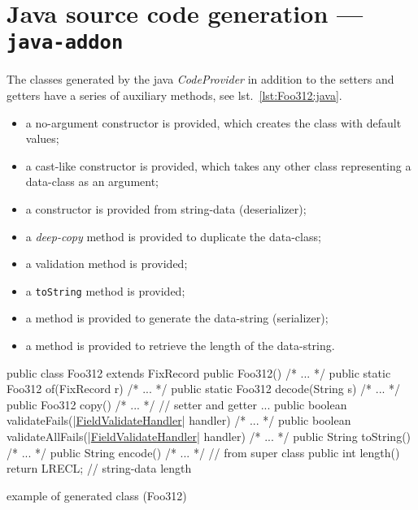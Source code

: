 \section{Java source code generation --- \texttt{java-addon}} 
\label{sec:java.addon}
The classes generated by the java \textsl{CodeProvider} in addition to the 
setters and getters have a series of auxiliary methods, see 
lst.~\ref{lst:Foo312:java}.

\begin{itemize}\setlength\itemsep{-0.5ex}
\item a no-argument constructor is provided, which creates the class with 
    default values;
\item a cast-like constructor is provided, which takes any other class 
    representing a data-class as an argument;
\item a constructor is provided from string-data (deserializer);
\item a \textit{deep-copy} method is provided to duplicate the data-class;
\item a validation method is provided;
\item a \texttt{toString} method is provided;
\item a method is provided to generate the data-string (serializer);
\item a method is provided to retrieve the length of the data-string.
\end{itemize}

\begin{elisting}[!htb]
\begin{javacode}
public class Foo312 extends FixRecord {
    public Foo312() { /* ... */ }
    public static Foo312 of(FixRecord r) { /* ... */ }
    public static Foo312 decode(String s) { /* ... */ }
    public Foo312 copy() { /* ... */ }
    // setter and getter ...
    public boolean validateFails(|\hyperref[lst:FieldValidateHandler:java]{FieldValidateHandler}| handler) { /* ... */ }
    public boolean validateAllFails(|\hyperref[lst:FieldValidateHandler:java]{FieldValidateHandler}| handler) { /* ... */ }
    public String toString() { /* ... */ }
    public String encode() { /* ... */ }    // from super class
    public int length() { return LRECL; }   // string-data length
}
\end{javacode}
\caption{example of generated class (Foo312)}
\label{lst:Foo312:java}
\end{elisting}

